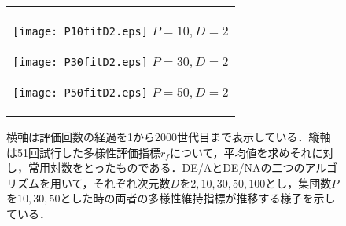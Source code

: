 \documentclass[a4paper,11pt,oneside,openany]{jsbook}
\begin{document}
\begin{figure}[htbp]
  \begin{center}
  \caption{横軸は評価回数の経過を1から2000世代目まで表示している．縦軸は51回試行した多様性評価指標$r_f$について，平均値を求めそれに対し，常用対数をとったものである．DE/AとDE/NAの二つのアルゴリズムを用いて，それぞれ次元数$D$を$2,10,30,50,100$とし，集団数$P$を$10,30,50$とした時の両者の多様性維持指標が推移する様子を示している．}
    \begin{tabular}{c}


      \begin{minipage}{0.33\hsize}
        \begin{center}
          \texttt{[image: P10fitD2.eps]}
          \hspace{1.2cm}$P=10, D=2
 $       \end{center}
      \end{minipage}

      \begin{minipage}{0.33\hsize}
        \begin{center}
          \texttt{[image: P30fitD2.eps]}
          \hspace{1.2cm}$P=30, D=2
 $       \end{center}
      \end{minipage}

      \begin{minipage}{0.33\hsize}
        \begin{center}
          \texttt{[image: P50fitD2.eps]}
          \hspace{1.2cm}$P=50, D=2
 $       \end{center}
      \end{minipage}
    \end{tabular}
  \end{center}
\end{figure}
\end{document}
